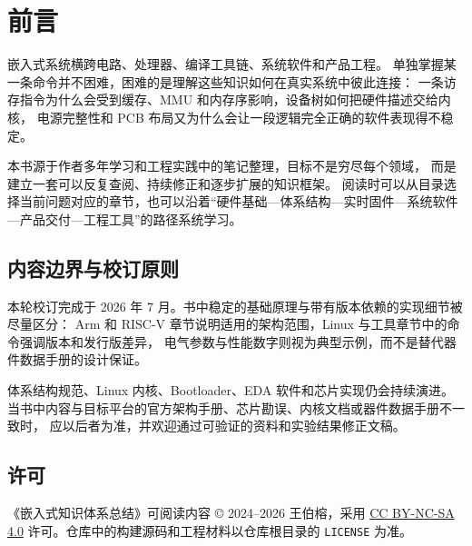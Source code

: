 \chapter*{前言}
%

嵌入式系统横跨电路、处理器、编译工具链、系统软件和产品工程。
单独掌握某一条命令并不困难，困难的是理解这些知识如何在真实系统中彼此连接：
一条访存指令为什么会受到缓存、MMU 和内存序影响，设备树如何把硬件描述交给内核，
电源完整性和 PCB 布局又为什么会让一段逻辑完全正确的软件表现得不稳定。

本书源于作者多年学习和工程实践中的笔记整理，目标不是穷尽每个领域，
而是建立一套可以反复查阅、持续修正和逐步扩展的知识框架。
阅读时可以从目录选择当前问题对应的章节，也可以沿着“硬件基础—体系结构—实时固件—系统软件—产品交付—工程工具”的路径系统学习。

\section*{内容边界与校订原则}

本轮校订完成于 2026 年 7 月。书中稳定的基础原理与带有版本依赖的实现细节被尽量区分：
Arm 和 RISC-V 章节说明适用的架构范围，Linux 与工具章节中的命令强调版本和发行版差异，
电气参数与性能数字则视为典型示例，而不是替代器件数据手册的设计保证。

体系结构规范、Linux 内核、Bootloader、EDA 软件和芯片实现仍会持续演进。
当书中内容与目标平台的官方架构手册、芯片勘误、内核文档或器件数据手册不一致时，
应以后者为准，并欢迎通过可验证的资料和实验结果修正文稿。

\section*{许可}

《嵌入式知识体系总结》可阅读内容 © 2024--2026 王伯榕，采用
\href{https://creativecommons.org/licenses/by-nc-sa/4.0/}{CC BY-NC-SA 4.0}
许可。仓库中的构建源码和工程材料以仓库根目录的 \texttt{LICENSE} 为准。
